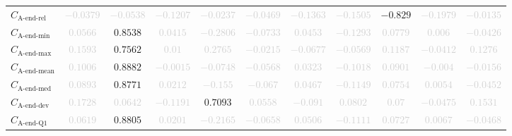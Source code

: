 \documentclass{standalone}
\newcommand{\lastactivitiesrelname}{\text{A-end-rel}}
\newcommand{\lastactivitiesrel}{C_{\lastactivitiesrelname}}
\newcommand{\lastminname}{\text{A-end-min}}
\newcommand{\lastmin}{C_{\lastminname}}
\newcommand{\lastmaxname}{\text{A-end-max}}
\newcommand{\lastmax}{C_{\lastmaxname}}
\newcommand{\lastmeanname}{\text{A-end-mean}}
\newcommand{\lastmean}{C_{\lastmeanname}}
\newcommand{\lastmedianname}{\text{A-end-med}}
\newcommand{\lastmedian}{C_{\lastmedianname}}
\newcommand{\lastdevname}{\text{A-end-dev}}
\newcommand{\lastdev}{C_{\lastdevname}}
\newcommand{\lastqonename}{\text{A-end-Q1}}
\newcommand{\lastqone}{C_{\lastqonename}}
\begin{document}
\begin{tabular}{lcccccccccc}
$\lastactivitiesrel$ & \textcolor{lightgray}{$-0.0379$} & \textcolor{lightgray}{$-0.0538$} & \textcolor{lightgray}{$-0.1207$} & \textcolor{lightgray}{$-0.0237$} & \textcolor{lightgray}{$-0.0469$} & \textcolor{lightgray}{$-0.1363$} & \textcolor{lightgray}{$-0.1505$} & $-0.829$ & \textcolor{lightgray}{$-0.1979$} & \textcolor{lightgray}{$-0.0135$} \\ 
$\lastmin$ & \textcolor{lightgray}{$0.0566$} & $0.8538$ & \textcolor{lightgray}{$0.0415$} & \textcolor{lightgray}{$-0.2806$} & \textcolor{lightgray}{$-0.0733$} & \textcolor{lightgray}{$0.0453$} & \textcolor{lightgray}{$-0.1293$} & \textcolor{lightgray}{$0.0779$} & \textcolor{lightgray}{$0.006$} & \textcolor{lightgray}{$-0.0426$} \\ 
$\lastmax$ & \textcolor{lightgray}{$0.1593$} & $0.7562$ & \textcolor{lightgray}{$0.01$} & \textcolor{lightgray}{$0.2765$} & \textcolor{lightgray}{$-0.0215$} & \textcolor{lightgray}{$-0.0677$} & \textcolor{lightgray}{$-0.0569$} & \textcolor{lightgray}{$0.1187$} & \textcolor{lightgray}{$-0.0412$} & \textcolor{lightgray}{$0.1276$} \\ 
$\lastmean$ & \textcolor{lightgray}{$0.1006$} & $0.8882$ & \textcolor{lightgray}{$-0.0015$} & \textcolor{lightgray}{$-0.0748$} & \textcolor{lightgray}{$-0.0568$} & \textcolor{lightgray}{$0.0323$} & \textcolor{lightgray}{$-0.1018$} & \textcolor{lightgray}{$0.0901$} & \textcolor{lightgray}{$-0.004$} & \textcolor{lightgray}{$-0.0156$} \\ 
$\lastmedian$ & \textcolor{lightgray}{$0.0893$} & $0.8771$ & \textcolor{lightgray}{$0.0212$} & \textcolor{lightgray}{$-0.155$} & \textcolor{lightgray}{$-0.067$} & \textcolor{lightgray}{$0.0467$} & \textcolor{lightgray}{$-0.1149$} & \textcolor{lightgray}{$0.0754$} & \textcolor{lightgray}{$0.0054$} & \textcolor{lightgray}{$-0.0452$} \\ 
$\lastdev$ & \textcolor{lightgray}{$0.1728$} & \textcolor{lightgray}{$0.0642$} & \textcolor{lightgray}{$-0.1191$} & $0.7093$ & \textcolor{lightgray}{$0.0558$} & \textcolor{lightgray}{$-0.091$} & \textcolor{lightgray}{$0.0802$} & \textcolor{lightgray}{$0.07$} & \textcolor{lightgray}{$-0.0475$} & \textcolor{lightgray}{$0.1531$} \\ 
$\lastqone$ & \textcolor{lightgray}{$0.0619$} & $0.8805$ & \textcolor{lightgray}{$0.0201$} & \textcolor{lightgray}{$-0.2165$} & \textcolor{lightgray}{$-0.0658$} & \textcolor{lightgray}{$0.0506$} & \textcolor{lightgray}{$-0.1111$} & \textcolor{lightgray}{$0.0727$} & \textcolor{lightgray}{$0.0067$} & \textcolor{lightgray}{$-0.0468$} \\ 

\end{tabular}
\end{document}
